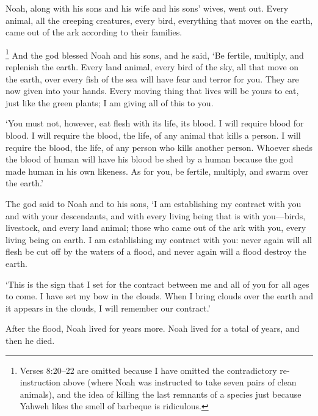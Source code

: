 Noah, along with his sons and his wife and his sons' wives, went
out. Every animal, all the creeping creatures, every bird, everything
that moves on the earth, came out of the ark according to their families.

\footnote{Verses 8:20--22 are omitted because 
I have omitted the contradictory re-instruction above
(where Noah was instructed to take seven pairs of clean animals),
and the idea of killing the last
remnants of a species 
just because Yahweh likes the smell of barbeque is ridiculous.}
And the god blessed Noah and his sons, and he said, 
`Be fertile, multiply, and replenish the earth. 
Every land animal,
every bird of the sky,
all that move on the earth, 
over every fish of the sea 
will have fear and terror for you. 
They are now given into your hands. 
Every moving thing that lives will be yours to eat,
just like the green plants;
I am giving all of this to you.

`You must not, however, eat flesh with its life, its blood.
I will require blood for blood.
I will require the blood, the life, of any animal that kills a person.
I will require the blood, the life, of any person who kills another person.
Whoever sheds the blood of human will have his blood be shed by a human 
because the god made human in his own likeness.
As for you, be fertile, multiply, and swarm over the earth.'

The god said to Noah and to his sons, 
`I am establishing my contract with you and with your descendants, 
and with every living being that is with you---birds, livestock, and every land animal;
those who came out of the ark with you, 
every living being on earth. 
I am establishing my contract with you: 
never again will all
flesh be cut off by the waters of a flood, 
and never again will a flood destroy the earth.

`This is the sign that I set for the contract 
between me and all of you for all ages to come.
I have set my bow in the clouds. 
When I bring clouds over the earth and it appears in the clouds,
I will remember our contract.'

After the flood, Noah lived for  years more. 
Noah lived for a total of  years,
and then he died.

